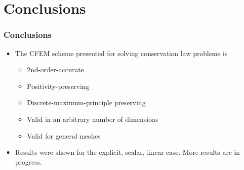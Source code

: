 \documentclass{beamer}
\begin{document}
\section{Conclusions}
\begin{frame}
\frametitle{Conclusions}

\begin{itemize}
   \item The CFEM scheme presented for solving conservation law problems is
   \begin{itemize}
      \item 2nd-order-accurate
      \item Positivity-preserving
      \item Discrete-maximum-principle preserving
      \item Valid in an arbitrary number of dimensions
      \item Valid for general meshes
   \end{itemize}
   \item Results were shown for the explicit, scalar, linear case. More results
      are in progress.
\end{itemize}

\end{frame}
\end{document}
